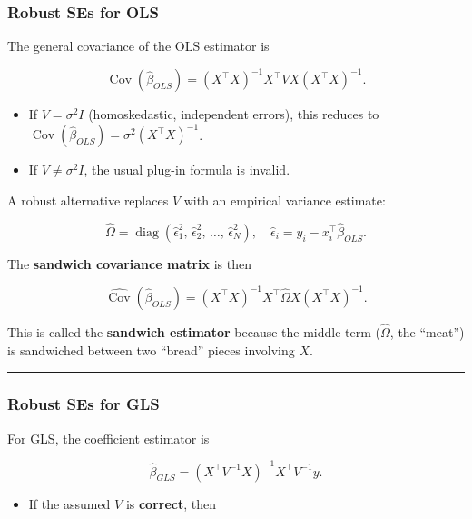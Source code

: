 \documentclass[
  letterpaper,
  DIV=11,
  numbers=noendperiod]{scrreprt}
\providecommand{\tightlist}{%
  \setlength{\itemsep}{0pt}\setlength{\parskip}{0pt}}\usepackage{longtable,booktabs,array}
\begin{document}
\hypertarget{robust-ses-for-ols}{%
\subsubsection*{Robust SEs for OLS}\label{robust-ses-for-ols}}

The general covariance of the OLS estimator is

\[
\operatorname{Cov}(\hat{\beta}_{OLS}) = (X^\top X)^{-1} X^\top V X (X^\top X)^{-1}.
\]

\begin{itemize}
\item
  If \(V = \sigma^2 I\) (homoskedastic, independent errors), this
  reduces to\\
  \(\operatorname{Cov}(\hat\beta_{OLS}) = \sigma^2 (X^\top X)^{-1}\).
\item
  If \(V \neq \sigma^2 I\), the usual plug-in formula is invalid.
\end{itemize}

A robust alternative replaces \(V\) with an empirical variance estimate:

\[
\hat\Omega = \operatorname{diag}(\hat\epsilon_1^2,\,\hat\epsilon_2^2,\,\ldots,\,\hat\epsilon_N^2),
\quad \hat\epsilon_i = y_i - x_i^\top \hat\beta_{OLS}.
\]

The \textbf{sandwich covariance matrix} is then

\[
\widehat{\operatorname{Cov}}(\hat\beta_{OLS}) =
(X^\top X)^{-1} X^\top \hat\Omega X (X^\top X)^{-1}.
\]

This is called the \textbf{sandwich estimator} because the middle term
(\(\hat\Omega\), the ``meat'') is sandwiched between two ``bread''
pieces involving \(X\).

\begin{center}\rule{0.5\linewidth}{0.5pt}\end{center}

\hypertarget{robust-ses-for-gls}{%
\subsubsection*{Robust SEs for GLS}\label{robust-ses-for-gls}}

For GLS, the coefficient estimator is

\[
\hat{\beta}_{GLS} = (X^\top V^{-1} X)^{-1} X^\top V^{-1} y.
\]

\begin{itemize}
\tightlist
\item
  If the assumed \(V\) is \textbf{correct}, then
\end{itemize}
\end{document}
